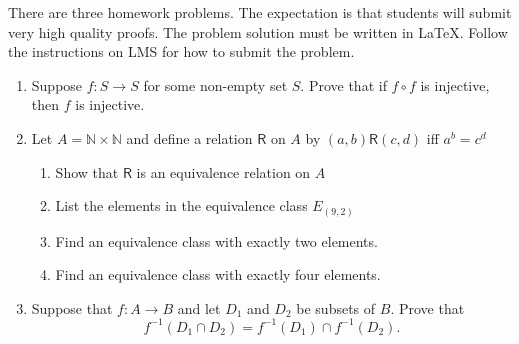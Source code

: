 \documentclass{article}
\begin{document}

There are three homework problems. The expectation is that students
will submit very high quality proofs. The problem solution must be written
in LaTeX. Follow the instructions on LMS for how to submit the problem.

\bigskip
\bigskip
\begin{enumerate}
\item Suppose $f: S \rightarrow S$ for some non-empty set $S$. Prove that if $f \circ f$ is injective, then $f$ is injective.  
\medskip
\item Let $A = \mathbb{N} \times \mathbb{N}$ and define a relation $\mathsf{R}$ on $A$ by $(a,b)\mathsf{R}(c,d)$ iff $a^b=c^d$
\begin{enumerate}
\item Show that $\mathsf{R}$ is an equivalence relation on $A$
\item List the elements in the equivalence class $E_{(9,2)}$
\item Find an equivalence class with exactly two elements.
\item Find an equivalence class with exactly four elements.
\end{enumerate}
 
 \medskip
\item Suppose that $f:A \rightarrow B$ and let $D_1$ and $D_2$ be subsets of $B$. Prove that 
$$ f^{-1}\left(D_1 \cap D_2 \right) = f^{-1}\left(D_1\right) \cap f^{-1}\left(D_2\right). $$

\end{enumerate}
\end{document}
